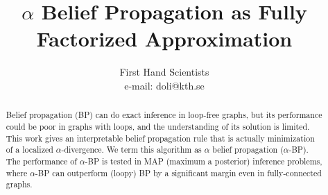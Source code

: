 \documentclass[conference,onecolumn]{IEEEtran}
\begin{document}
\title{$\alpha$ Belief Propagation as Fully Factorized Approximation}
\author{First Hand Scientists\\
  e-mail: doli@kth.se}




\maketitle
\begin{abstract}
  Belief propagation (BP) can do exact inference in loop-free graphs, but its performance could be poor in graphs with loops, and the understanding of its solution is limited.
  This work gives an interpretable belief propagation rule that is actually minimization of a localized $\alpha$-divergence. We term this algorithm as $\alpha$ belief propagation ($\alpha$-BP). %
  The performance of $\alpha$-BP is tested in MAP (maximum a posterior) inference problems, where
  $\alpha$-BP can outperform (loopy) BP by a significant margin even in fully-connected graphs. 
  
\end{abstract}
\end{document}
